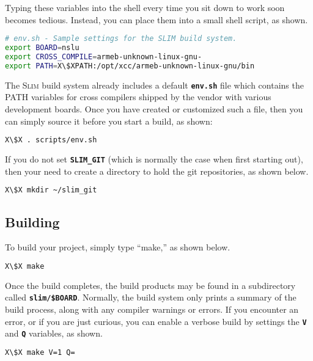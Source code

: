 \documentclass[a4paper,10pt]{article}
\newcommand{\slim}{\textsc{Slim}\xspace}
\newcommand{\fw}{\tt\bf}
\begin{document}
    Typing these variables into the shell every time you sit down to
    work soon becomes tedious. Instead, you can place them into a
    small shell script, as shown.

\begin{lstlisting}[language=bash,escapechar=X]
# env.sh - Sample settings for the SLIM build system.
export BOARD=nslu
export CROSS_COMPILE=armeb-unknown-linux-gnu-
export PATH=X\$XPATH:/opt/xcc/armeb-unknown-linux-gnu/bin
\end{lstlisting}

    The \slim build system already includes a default {\fw env.sh}
    file which contains the PATH variables for cross compilers shipped
    by the vendor with various development boards. Once you have
    created or customized such a file, then you can simply source it
    before you start a build, as shown:

\begin{lstlisting}[language=bash,escapechar=X]
X\$X . scripts/env.sh
\end{lstlisting}

    If you do not set {\fw SLIM\_GIT} (which is normally the case when
    first starting out), then your need to create a directory to hold
    the git repositories, as shown below.

\begin{lstlisting}[language=bash,escapechar=X]
X\$X mkdir ~/slim_git
\end{lstlisting}

\subsection{Building} \label{Building}

    To build your project, simply type ``make,'' as shown below.

\begin{lstlisting}[language=bash,escapechar=X]
X\$X make
\end{lstlisting}

    Once the build completes, the build products may be found in a
    subdirectory called {\fw slim/\$BOARD}. Normally, the build system
    only prints a summary of the build process, along with any
    compiler warnings or errors. If you encounter an error, or if you
    are just curious, you can enable a verbose build by settings the
    {\fw V} and {\fw Q} variables, as shown.

\begin{lstlisting}[language=bash,escapechar=X]
X\$X make V=1 Q=
\end{lstlisting}
\end{document}
